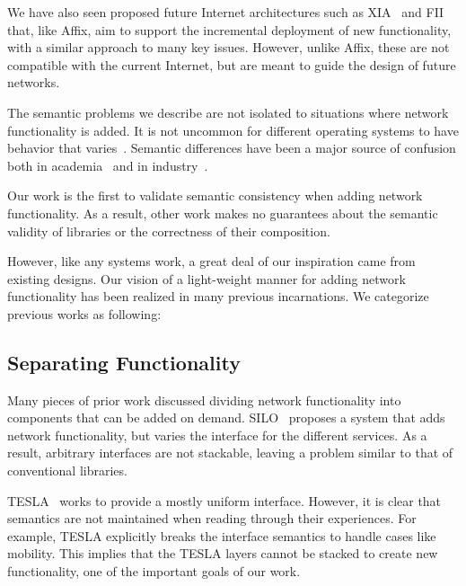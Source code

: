 We have also seen proposed future Internet architectures
such as XIA~\cite{xia_2012} and FII~\cite{koponen_architecting_2011}
that, like Affix, aim to 
support the incremental deployment of new functionality, 
with a similar approach to many key issues.
However, unlike Affix, 
these are not compatible with the current
Internet, but are meant to guide the design 
of future networks.


\iffalse
The semantic problems we describe are not isolated to
situations where network functionality is added. It
is not uncommon for different operating systems to have behavior that
varies~\cite{IEEE:2001:ISRa}.
Semantic differences have been a major source of confusion 
both in academia~\cite{schmidt1995object, demmer2007towards, 
salz2002tesla} and in industry~\cite{BSDLinuxDiff, 
WinsockPort, NonBlockingDiff, BSDCompat, SOLINGERSemantics, CapposPythonBug1,
REUSEADDRSemantics}.

Our work is the first to validate semantic consistency when adding 
network functionality.   As a result, other work makes no guarantees about
the semantic validity of libraries or the correctness of their composition.



However, like any systems work, a great deal of our inspiration came from 
existing designs.   Our vision of a light-weight manner for adding network 
functionality has been realized in many previous incarnations. We categorize previous works as following:

\subsection{Separating Functionality}

Many pieces of prior work discussed dividing network functionality into 
components that can be added on demand.   
SILO~\cite{dutta2007silo, baldine2007unified} proposes a system that adds 
network functionality, but varies the interface for the different services. As 
a result, arbitrary interfaces are not stackable,  leaving a 
problem similar to that of conventional libraries.   
  

TESLA~\cite{salz2002tesla, salz2003tesla} works to provide a mostly uniform 
interface.   However, it is clear that semantics are not maintained when 
reading through their experiences.   For example, TESLA explicitly breaks 
the interface semantics to handle cases like mobility.
This implies that the TESLA layers cannot be stacked to create new 
functionality, one of the important goals of our work.  

